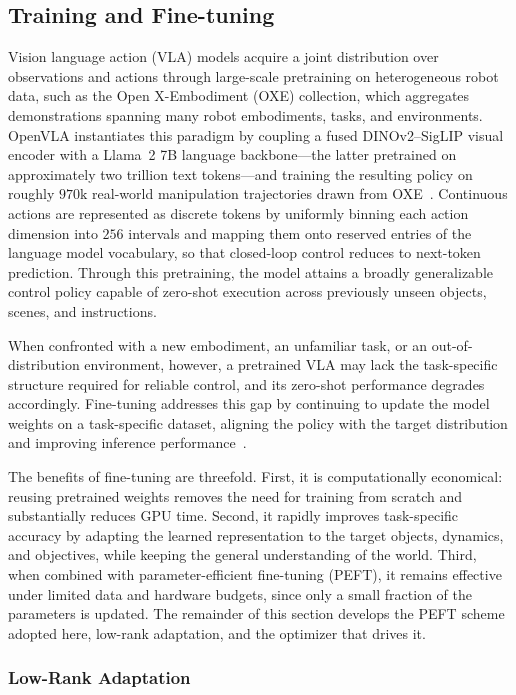 \documentclass[english,12pt,a4paper,pdftex,elec,utf8]{aaltothesis}
\begin{document}
\subsection{Training and Fine-tuning}
\label{sec:vla-training}

Vision language action (VLA) models acquire a joint distribution over observations and actions through large-scale pretraining on heterogeneous robot data, such as the Open X-Embodiment (OXE) collection, which aggregates demonstrations spanning many robot embodiments, tasks, and environments. OpenVLA instantiates this paradigm by coupling a fused DINOv2--SigLIP visual encoder with a Llama~2 7B language backbone---the latter pretrained on approximately two trillion text tokens---and training the resulting policy on roughly $970\text{k}$ real-world manipulation trajectories drawn from OXE~\cite{kim2024openvla}. Continuous actions are represented as discrete tokens by uniformly binning each action dimension into $256$ intervals and mapping them onto reserved entries of the language model vocabulary, so that closed-loop control reduces to next-token prediction. Through this pretraining, the model attains a broadly generalizable control policy capable
of zero-shot execution across previously unseen objects, scenes, and instructions.

When confronted with a new embodiment, an unfamiliar task, or an out-of-distribution environment, however, a pretrained VLA may lack the task-specific structure required for reliable control, and its zero-shot
performance degrades accordingly. Fine-tuning addresses this gap by continuing to update the model weights on a task-specific dataset, aligning the policy with the target distribution and improving inference
performance~\cite{kim2024openvla}.

The benefits of fine-tuning are threefold. First, it is computationally economical: reusing pretrained weights removes the need for training from scratch and substantially reduces GPU time. Second, it rapidly improves task-specific accuracy by adapting the learned representation to the target objects, dynamics, and
objectives, while keeping the general understanding of the world. Third, when combined with parameter-efficient fine-tuning (PEFT), it remains effective under limited data and hardware budgets, since only a small fraction of the parameters is updated. The remainder of this section develops the PEFT scheme adopted here, low-rank adaptation, and the optimizer that drives it.

\subsubsection{Low-Rank Adaptation}
\label{sec:lora}
\end{document}
